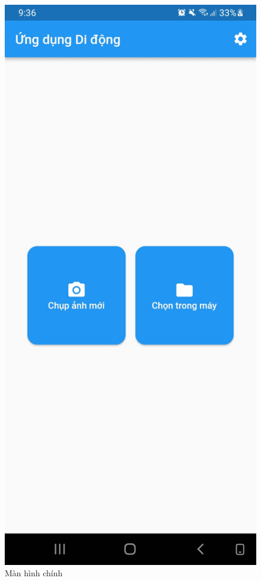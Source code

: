 \documentclass[a4paper,14pt]{extarticle}
\begin{document}
	\begin{figure}[H]
		\centering
		\includegraphics[scale=0.1]{images/screenshot1.jpg}
		\caption{Màn hình chính}
	\end{figure}
\end{document}
